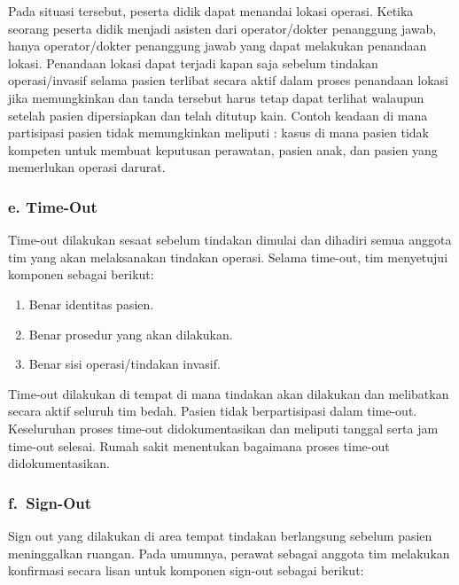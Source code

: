 \documentclass[
]{book}
\providecommand{\tightlist}{%
  \setlength{\itemsep}{0pt}\setlength{\parskip}{0pt}}
\begin{document}
Pada situasi tersebut, peserta didik dapat menandai lokasi operasi. Ketika seorang peserta didik menjadi asisten dari operator/dokter penanggung jawab, hanya operator/dokter penanggung jawab yang dapat melakukan penandaan lokasi. Penandaan lokasi dapat terjadi kapan saja sebelum tindakan operasi/invasif selama pasien terlibat secara aktif dalam proses penandaan lokasi jika memungkinkan dan tanda tersebut harus tetap dapat terlihat walaupun setelah pasien dipersiapkan dan telah ditutup kain. Contoh keadaan di mana partisipasi pasien tidak memungkinkan meliputi : kasus di mana pasien tidak kompeten untuk membuat keputusan perawatan, pasien anak, dan pasien yang memerlukan operasi darurat.

\hypertarget{e.-time-out}{%
\subsubsection*{e. Time-Out}\label{e.-time-out}}

Time-out dilakukan sesaat sebelum tindakan dimulai dan dihadiri semua anggota tim yang akan melaksanakan tindakan operasi. Selama time-out, tim menyetujui komponen sebagai berikut:

\begin{enumerate}
\def\labelenumi{\arabic{enumi}.}
\tightlist
\item
  Benar identitas pasien.
\item
  Benar prosedur yang akan dilakukan.
\item
  Benar sisi operasi/tindakan invasif.
\end{enumerate}

Time-out dilakukan di tempat di mana tindakan akan dilakukan dan melibatkan secara aktif seluruh tim bedah. Pasien tidak berpartisipasi dalam time-out. Keseluruhan proses time-out didokumentasikan dan meliputi tanggal serta jam time-out selesai. Rumah sakit menentukan bagaimana proses time-out didokumentasikan.

\hypertarget{f.-sign-out}{%
\subsubsection*{f.~Sign-Out}\label{f.-sign-out}}

Sign out yang dilakukan di area tempat tindakan berlangsung sebelum pasien meninggalkan ruangan. Pada umumnya, perawat sebagai anggota tim melakukan konfirmasi secara lisan untuk komponen sign-out sebagai berikut:
\end{document}
